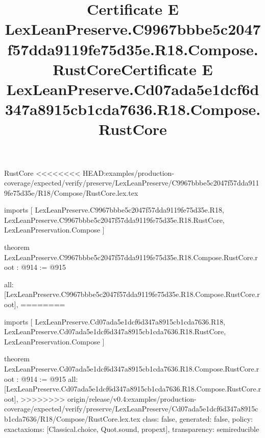 \begin{lexlean}{RustCore}
<<<<<<<< HEAD:examples/production-coverage/expected/verify/preserve/LexLeanPreserve/C9967bbbe5c2047f57dda9119fe75d35e/R18/Compose/RustCore.lex.tex
\title{Certificate E LexLeanPreserve.C9967bbbe5c2047f57dda9119fe75d35e.R18.Compose.RustCore}
\begin{coremodule}
imports [
  LexLeanPreserve.C9967bbbe5c2047f57dda9119fe75d35e.R18,
  LexLeanPreserve.C9967bbbe5c2047f57dda9119fe75d35e.R18.RustCore,
  LexLeanPreservation.Compose
]

theorem LexLeanPreserve.C9967bbbe5c2047f57dda9119fe75d35e.R18.Compose.RustCore.root : @914 := @915 {
  all: [LexLeanPreserve.C9967bbbe5c2047f57dda9119fe75d35e.R18.Compose.RustCore.root],
========
\title{Certificate E LexLeanPreserve.Cd07ada5e1dcf6d347a8915cb1cda7636.R18.Compose.RustCore}
\begin{coremodule}
imports [
  LexLeanPreserve.Cd07ada5e1dcf6d347a8915cb1cda7636.R18,
  LexLeanPreserve.Cd07ada5e1dcf6d347a8915cb1cda7636.R18.RustCore,
  LexLeanPreservation.Compose
]

theorem LexLeanPreserve.Cd07ada5e1dcf6d347a8915cb1cda7636.R18.Compose.RustCore.root : @914 := @915 {
  all: [LexLeanPreserve.Cd07ada5e1dcf6d347a8915cb1cda7636.R18.Compose.RustCore.root],
>>>>>>>> origin/release/v0.4:examples/production-coverage/expected/verify/preserve/LexLeanPreserve/Cd07ada5e1dcf6d347a8915cb1cda7636/R18/Compose/RustCore.lex.tex
  class: false,
  generated: false,
  policy: exact{axioms: [Classical.choice, Quot.sound, propext]},
  transparency: semireducible
}


\end{coremodule}}
\end{coremodule}
\end{lexlean}
